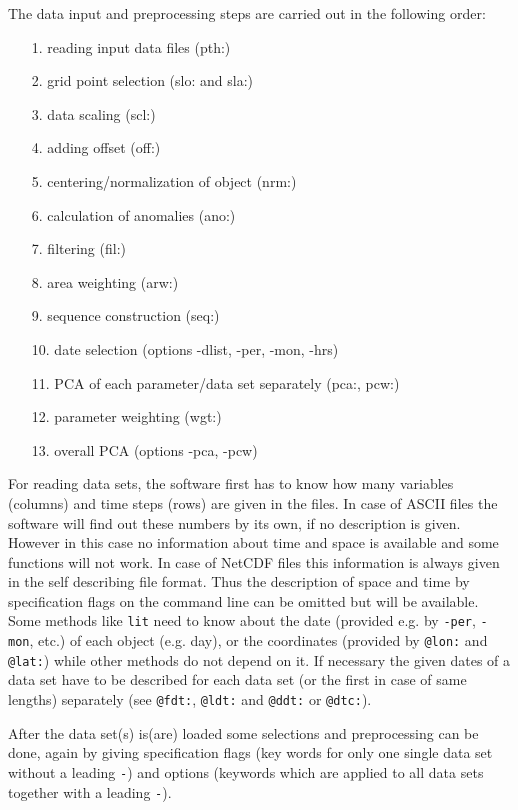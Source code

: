 \documentclass[12pt, oneside, a4paper, headsepline, plainheadsepline]{scrbook}
\begin{document}
The data input and preprocessing steps are carried out in the following order:
\begin{itemize}
\item[1.] reading input data files (pth:)
\item[2.] grid point selection (slo: and sla:)
\item[3.] data scaling (scl:)
\item[4.] adding offset (off:)
\item[5.] centering/normalization of object (nrm:)
\item[6.] calculation of anomalies (ano:)
\item[7.] filtering (fil:)
\item[8.] area weighting  (arw:)
\item[9.] sequence construction (seq:)
\item[10.] date selection (options -dlist, -per, -mon, -hrs)
\item[11.] PCA of each parameter/data set separately (pca:, pcw:)
\item[12.] parameter weighting (wgt:)
\item[13.] overall PCA (options -pca, -pcw)
\end{itemize}

For reading data sets, the software first has to know how many variables (columns) and time steps (rows) are given in the files.
In case of ASCII files the software will find out these numbers by its own, if no description is given. 
However in this case no information about time and space is available and some functions will not work.
In case of NetCDF files this information is always given in the self describing file format. Thus the description of space and time
by specification flags on the command line can be omitted but will be available. 
Some methods like \verb+lit+ need to know about the date (provided e.g. by \verb+-per+, \verb+-mon+, etc.) of each object (e.g. day), 
or the coordinates (provided by \verb+@lon:+ and \verb+@lat:+) while other methods do not depend on it. If necessary the given dates
of a data set have to be described for each data set (or the first in case of same lengths) separately 
(see \verb+@fdt:+, \verb+@ldt:+ and \verb+@ddt:+ or \verb+@dtc:+). 

After the data set(s) is(are) loaded some selections and preprocessing can be done, again by giving specification 
flags (key words for only one single data set without a leading \verb+-+) and 
options (keywords which are applied to all data sets together with a leading \verb+-+).
\end{document}
